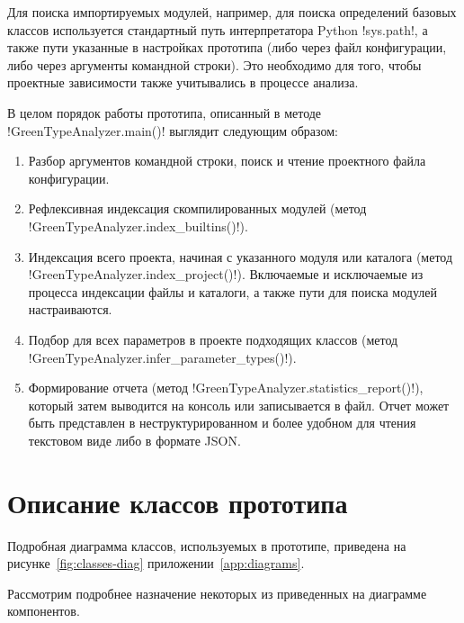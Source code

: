 Для поиска импортируемых модулей, например, для поиска определений базовых
классов используется стандартный путь интерпретатора Python !sys.path!, а также пути
указанные в настройках прототипа (либо через файл конфигурации, либо через
аргументы командной строки). Это необходимо для того, чтобы проектные
зависимости также учитывались в процессе анализа.

В целом порядок работы прототипа, описанный в методе !GreenTypeAnalyzer.main()! 
выглядит следующим образом:

\begin{enumerate}
    \item Разбор аргументов командной строки, поиск и чтение проектного файла
      конфигурации.

    \item Рефлексивная индексация скомпилированных модулей (метод
      !GreenTypeAnalyzer.index_builtins()!).

    \item Индексация всего проекта, начиная с указанного модуля или каталога 
      (метод !GreenTypeAnalyzer.index_project()!).
      Включаемые и исключаемые из процесса индексации файлы и каталоги, а также
      пути для поиска модулей настраиваются. 

    \item Подбор для всех параметров в проекте подходящих классов (метод
      !GreenTypeAnalyzer.infer_parameter_types()!).

    \item Формирование отчета (метод !GreenTypeAnalyzer.statistics_report()!),
      который затем выводится на консоль или записывается в файл. Отчет может
      быть представлен в неструктурированном и более удобном для чтения
      текстовом виде либо в формате JSON.

\end{enumerate}

\section{Описание классов прототипа}
\label{sec:classes-description}

Подробная диаграмма классов, используемых в прототипе, приведена на
 рисунке~\ref{fig:classes-diag} приложении~\ref{app:diagrams}.

Рассмотрим подробнее назначение некоторых из приведенных на диаграмме компонентов.

